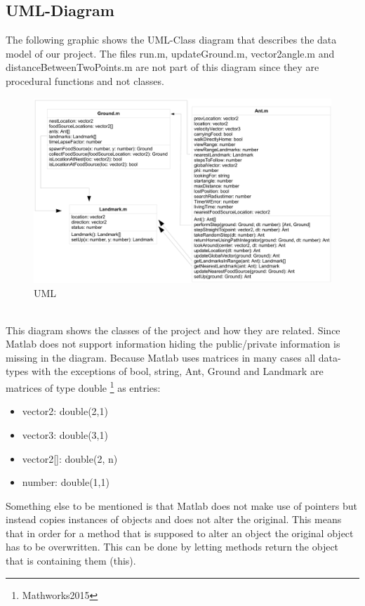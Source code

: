 \documentclass[11pt]{article}
\begin{document}
\subsection{UML-Diagram}
The following graphic shows the UML-Class diagram that describes the data model of our project.
The files run.m, updateGround.m, vector2angle.m and distanceBetweenTwoPoints.m are not part of
this diagram since they are procedural functions and not classes.
\begin{figure}[h]
\includegraphics[scale=0.35]{./Pics/uml.png} 
\caption[UML]{UML}
\end{figure} \\
This diagram shows the classes of the project and how they are related. Since Matlab does not
support information hiding the public/private information is missing in the diagram. Because
 Matlab uses matrices in many cases all data-types with the exceptions of bool, string, Ant, Ground
and Landmark are matrices of type double \footnote{ Mathworks2015\cite{Mathworks2015}}  as entries:
\begin{itemize}
\item vector2: double(2,1)
\item vector3: double(3,1)
\item vector2[]: double(2, n)
\item number: double(1,1)
\end{itemize}
Something else to be mentioned is that Matlab does not make use of pointers but instead copies
instances of objects and does not alter the original. This means that in order for a method that is
supposed to alter an object the original object has to be overwritten. This can be done by letting
methods return the object that is containing them (this).
\end{document}
